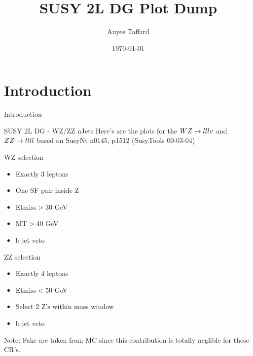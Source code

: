 \documentclass[10pt]{beamer}
\begin{document}
\author{Anyes Taffard}
\date{\today}

\title[SUSY 2L DG WZ/ZZ CR]{SUSY 2L DG Plot Dump}

\begin{frame}[plain]
  \titlepage
\end{frame}

\section{Introduction}
\begin{frame}{Introduction}
  \begin{block}{SUSY 2L DG - WZ/ZZ nJets }
    Here's are the plots for the $WZ\rightarrow lllv$ and $ZZ \rightarrow llll$ based on SusyNt n0145, p1512 (SusyTools 00-03-04)



    WZ selection
    \begin{itemize}
      \item Exactly 3 leptons 
      \item One SF pair inside Z   
      \item Etmiss$>$30 GeV
      \item MT$>$40 GeV
      \item b-jet veto  
    \end{itemize}
    ZZ selection
    \begin{itemize}    
      \item Exactly 4 leptons
      \item Etmiss$<$50 GeV
      \item Select 2 Z's within mass window  
      \item b-jet veto
    \end{itemize}

    Note: Fake are taken from MC since this contribution is totally neglible for these CR's.
  \end{block}
\end{frame}
\end{document}
